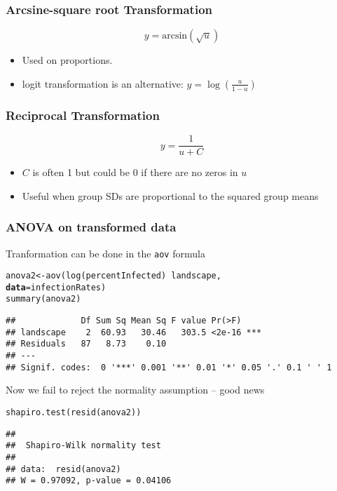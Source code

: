 \documentclass[color=usenames,dvipsnames]{beamer}\usepackage[]{graphicx}\usepackage[]{color}
\makeatletter
\newcommand{\hlopt}[1]{\textcolor[rgb]{0,0,0}{#1}}%
\newcommand{\hlstd}[1]{\textcolor[rgb]{0,0,0}{#1}}%
\newcommand{\hlkwb}[1]{\textcolor[rgb]{0,0.341,0.682}{#1}}%
\newcommand{\hlkwc}[1]{\textcolor[rgb]{0,0,0}{\textbf{#1}}}%
\newcommand{\hlkwd}[1]{\textcolor[rgb]{0.004,0.004,0.506}{#1}}%
\newenvironment{kframe}{%
 \def\at@end@of@kframe{}%
 \ifinner\ifhmode%
  \def\at@end@of@kframe{\end{minipage}}%
  \begin{minipage}{\columnwidth}%
 \fi\fi%
 \def\FrameCommand##1{\hskip\@totalleftmargin \hskip-\fboxsep
 \colorbox{shadecolor}{##1}\hskip-\fboxsep
     \hskip-\linewidth \hskip-\@totalleftmargin \hskip\columnwidth}%
 \MakeFramed {\advance\hsize-\width
   \@totalleftmargin\z@ \linewidth\hsize
   \@setminipage}}%
 {\par\unskip\endMakeFramed%
 \at@end@of@kframe}
\newenvironment{knitrout}{}{} %
\newcommand{\inr}[1]{\colorbox{inlinecolor}{\texttt{#1}}}
\makeatother
\begin{document}
\begin{frame}
  \frametitle{Arcsine-square root Transformation}
  \LARGE
  \[
  y = \mathrm{arcsin}(\sqrt{u})
  \]
  \large
  \begin{itemize}%
    \item Used on proportions.
    \item logit transformation is an alternative: $y = \log(\frac{u}{1-u})$
  \end{itemize}
\end{frame}




\begin{frame}
  \frametitle{Reciprocal Transformation}
  \LARGE
  \[
  y = \frac{1}{u + C}
  \]
  \large
  \begin{itemize}%
    \item $C$ is often 1 but could be 0 if there are no zeros in $u$
    \item Useful when group SDs are proportional to the squared group means
  \end{itemize}
\end{frame}



\begin{frame}[fragile]
  \frametitle{ANOVA on transformed data}
  \small
  {Tranformation can be done in the \inr{aov} formula}
\begin{knitrout}\footnotesize
{}\color{fgcolor}\begin{kframe}
\begin{alltt}
\hlstd{anova2} \hlkwb{<-} \hlkwd{aov}\hlstd{(}\hlkwd{log}\hlstd{(percentInfected)}\hlopt{~}\hlstd{landscape,}
              \hlkwc{data}\hlstd{=infectionRates)}
\hlkwd{summary}\hlstd{(anova2)}
\end{alltt}
\begin{verbatim}
##             Df Sum Sq Mean Sq F value Pr(>F)    
## landscape    2  60.93   30.46   303.5 <2e-16 ***
## Residuals   87   8.73    0.10                   
## ---
## Signif. codes:  0 '***' 0.001 '**' 0.01 '*' 0.05 '.' 0.1 ' ' 1
\end{verbatim}
\end{kframe}
\end{knitrout}
  \pause
  \vfill
  {Now we fail to reject the normality assumption -- good news}
\begin{knitrout}\footnotesize
{}\color{fgcolor}\begin{kframe}
\begin{alltt}
\hlkwd{shapiro.test}\hlstd{(}\hlkwd{resid}\hlstd{(anova2))}
\end{alltt}
\begin{verbatim}
## 
## 	Shapiro-Wilk normality test
## 
## data:  resid(anova2)
## W = 0.97092, p-value = 0.04106
\end{verbatim}
\end{kframe}
\end{knitrout}
\end{frame}
\end{document}
